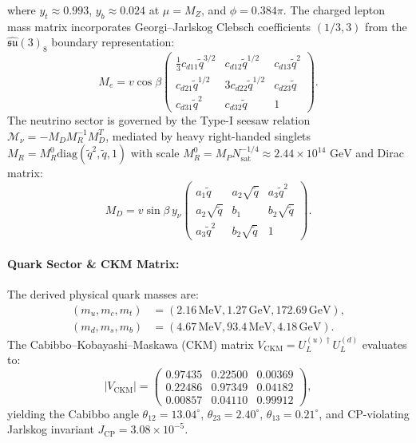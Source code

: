 \documentclass[11pt,letterpaper]{article}
\theoremstyle{plain}
\begin{document}
where $y_t \approx 0.993$, $y_b \approx 0.024$ at $\mu = M_Z$, and $\phi = 0.384\pi$. The charged lepton mass matrix incorporates Georgi--Jarlskog Clebsch coefficients $(1/3, 3)$ from the $\widehat{\mathfrak{su}}(3)_8$ boundary representation:
\begin{equation}
M_e = v \cos\beta \begin{pmatrix} 
\frac{1}{3} c_{d11} \tilde{q}^{3/2} & c_{d12} \tilde{q}^{1/2} & c_{d13} \tilde{q}^2 \\ 
c_{d21} \tilde{q}^{1/2} & 3 c_{d22} \tilde{q}^{1/2} & c_{d23} \tilde{q} \\ 
c_{d31} \tilde{q}^2 & c_{d32} \tilde{q} & 1 
\end{pmatrix}.
\end{equation}
The neutrino sector is governed by the Type-I seesaw relation $\mathcal{M}_\nu = - M_D M_R^{-1} M_D^T$, mediated by heavy right-handed singlets $M_R = M_R^0 \mathrm{diag}(\tilde{q}^2, \tilde{q}, 1)$ with scale $M_R^0 = M_P N_{\mathrm{sat}}^{-1/4} \approx 2.44 \times 10^{14}\text{ GeV}$ and Dirac matrix:
\begin{equation}
M_D = v \sin\beta \, y_\nu \begin{pmatrix} 
a_1 \tilde{q} & a_2 \sqrt{\tilde{q}} & a_3 \tilde{q}^2 \\ 
a_2 \sqrt{\tilde{q}} & b_1 & b_2 \sqrt{\tilde{q}} \\ 
a_3 \tilde{q}^2 & b_2 \sqrt{\tilde{q}} & 1 
\end{pmatrix}.
\end{equation}

\paragraph{Quark Sector \& CKM Matrix:}
The derived physical quark masses are:
\begin{align}
(m_u, m_c, m_t) &= (2.16\,\mathrm{MeV}, 1.27\,\mathrm{GeV}, 172.69\,\mathrm{GeV}), \nonumber \\
(m_d, m_s, m_b) &= (4.67\,\mathrm{MeV}, 93.4\,\mathrm{MeV}, 4.18\,\mathrm{GeV}).
\end{align}
The Cabibbo--Kobayashi--Maskawa (CKM) matrix $V_{\mathrm{CKM}} = U_L^{(u)\dagger} U_L^{(d)}$ evaluates to:
\begin{equation}
|V_{\mathrm{CKM}}| = \begin{pmatrix}
0.97435 & 0.22500 & 0.00369 \\
0.22486 & 0.97349 & 0.04182 \\
0.00857 & 0.04110 & 0.99912
\end{pmatrix},
\end{equation}
yielding the Cabibbo angle $\theta_{12} = 13.04^\circ$, $\theta_{23} = 2.40^\circ$, $\theta_{13} = 0.21^\circ$, and CP-violating Jarlskog invariant $J_{\mathrm{CP}} = 3.08 \times 10^{-5}$.
\end{document}
